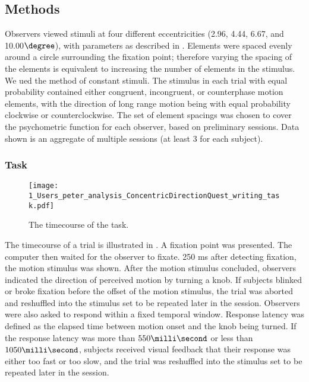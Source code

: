 \documentclass[english,jou]{article}
\begin{document}
\subsection{Methods}




Observers viewed stimuli at four different eccentricities (2.96, 4.44, 6.67, and 10.00$\degree$),
with parameters as described in . Elements were
spaced evenly around a circle surrounding the fixation point; therefore
varying the spacing of the elements is equivalent to increasing the
number of elements in the stimulus. We ued the method of constant
stimuli. The stimulus in each trial with equal probability contained
either congruent, incongruent, or counterphase motion elements, with
the direction of long range motion being with equal probability clockwise
or counterclockwise. The set of element spacings was chosen to cover
the psychometric function for each observer, based on preliminary
sessions. Data shown is an aggregate of multiple sessions (at least
3 for each subject).


\subsubsection{Task}

\begin{figure}
\texttt{[image: 1\_Users\_peter\_analysis\_ConcentricDirectionQuest\_writing\_task.pdf]}\caption{\label{fig:task}The timecourse of the task.}
\end{figure}


The timecourse of a trial is illustrated in . A
fixation point was presented. The computer then waited for the observer
to fixate. 250 ms after detecting fixation, the motion stimulus was
shown. After the motion stimulus concluded, observers indicated the
direction of perceived motion by turning a knob. If subjects blinked
or broke fixation before the offset of the motion stimulus, the trial
was aborted and reshuffled into the stimulus set to be repeated later
in the session. Observers were also asked to respond within a fixed
temporal window. Response latency was defined as the elapsed time
between motion onset and the knob being turned.  If the response latency
was more than $550\milli\second$
or less than $1050\milli\second$,
subjects received visual feedback that their response was either too
fast or too slow, and the trial was reshuffled into the stimulus set
to be repeated later in the session.
\end{document}
